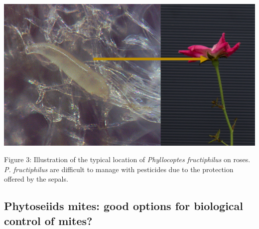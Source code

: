 \documentclass[12pt,final,CPage]{ufthesis}
\begin{document}
{  \begin{center}\includegraphics[width=0.8\linewidth]{figure/mite-pfruct-hide} \end{center}

  Figure 3: Illustration of the typical location of \emph{Phyllocoptes fructiphilus} on roses. \emph{P. fructiphilus} are difficult to manage with pesticides due to the protection offered by the sepals.

  \hypertarget{litrev-preds}{%
  \subsection{Phytoseiids mites: good options for biological control of mites?}\label{litrev-preds}}

}
\end{document}
